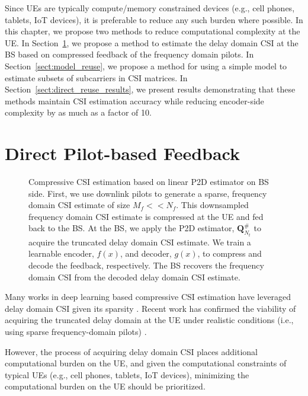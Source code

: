 Since UEs are typically compute/memory constrained devices (e.g., cell phones, tablets, IoT devices), it is preferable to reduce any such burden where possible. In this chapter, we propose two methods to reduce computational complexity at the UE. In Section~\ref{sect:direct_pilots}, we propose a method to estimate the delay domain CSI at the BS based on compressed feedback of the frequency domain pilots. In Section~\ref{sect:model_reuse}, we propose a method for using a simple model to estimate subsets of subcarriers in CSI matrices. In Section~\ref{sect:direct_reuse_results}, we present results demonstrating that these methods maintain CSI estimation accuracy while reducing encoder-side complexity by as much as a factor of 10. 

\section{Direct Pilot-based Feedback} \label{sect:direct_pilots}

\begin{figure}[!hbtp]
    \centering
    {
      \fontsize{8pt}{8pt}
      \def\svgwidth{1.0\linewidth}
      
    }
    \caption{Compressive CSI estimation based on linear P2D estimator on BS side. First,
    we use downlink pilots to 
    generate a sparse, frequency domain CSI
    estimate 
    of size $M_f << N_f$. This downsampled frequency domain CSI estimate is compressed at the UE
    and fed back to the BS.
    At the BS, we apply
    the P2D estimator, $\mathbf{Q}^{\#}_{N_t}$ \cite{ref:delRosario2022p2d} to acquire 
    the truncated
    delay domain CSI estimate.
    We train a
    learnable encoder, 
    $f(x)$,
    and decoder, $g(x)$, to compress and decode the feedback, respectively. The 
    BS recovers
    the frequency domain
    CSI from 
    the decoded 
    delay domain CSI estimate.}
    \label{fig:p2d_direct}
\end{figure}

Many works in deep learning based compressive CSI estimation 
have leveraged delay domain CSI given its sparsity \cite{ref:csinet}.
Recent work has confirmed the viability of acquiring the truncated delay domain 
at the UE under realistic conditions (i.e., using sparse frequency-domain pilots) \cite{ref:delRosario2022p2d}.

However, the process of acquiring delay domain CSI places additional 
computational burden on the UE, and given the computational constraints
of typical UEs (e.g., cell phones, tablets, IoT devices), minimizing the 
computational burden on the UE should be prioritized.

